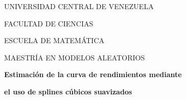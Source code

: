
\thispagestyle{empty}


\begin{center}

\vspace*{-1.5cm}


\vspace{.5cm}

\begin{small}
UNIVERSIDAD CENTRAL DE VENEZUELA

\vspace{-0.1cm}

FACULTAD DE CIENCIAS

\vspace{-0.1cm}

ESCUELA DE MATEM\'ATICA

\vspace{-0.1cm}

MAESTR\'IA EN MODELOS ALEATORIOS

\vspace{-0.1cm}

\end{small}

\vspace{2cm}

\begin{Huge}

{\bf Estimaci\'on de la curva de rendimientos mediante}

{\bf el uso de splines c\'ubicos suavizados}


\end{Huge}

\end{center}


